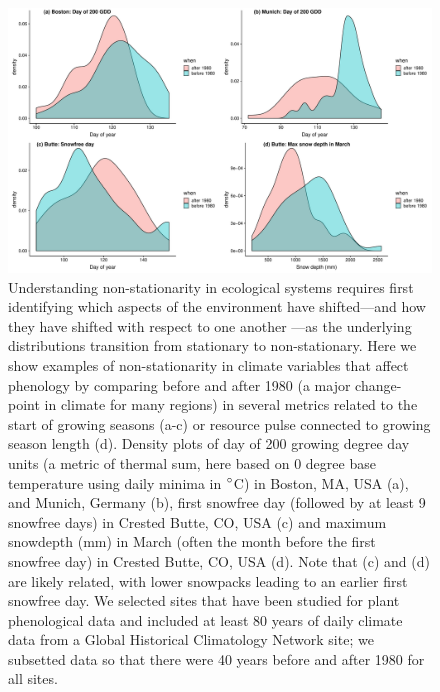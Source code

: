 \documentclass[11pt,letterpaper]{article}
\begin{document}
\begin{figure}[h!]
\centering
\includegraphics[width=1\textwidth]{..//..//..//R/graphs/otherdat/climdata.pdf}
\caption{Understanding non-stationarity in ecological systems requires first identifying which aspects of the environment have shifted---and how they have shifted with respect to one another \citep[e.g.,][]{cookwine2016,wadgymar2018}---as the underlying  distributions transition from stationary to non-stationary. Here we show examples of non-stationarity in climate variables that affect phenology by comparing before and after 1980 (a major change-point in climate for many regions) in several metrics related to the start of growing seasons (a-c) or resource pulse connected to growing season length (d). Density plots of day of 200 growing degree day units (a metric of thermal sum, here based on 0 degree base temperature using daily minima in $\degree$C) in Boston, MA, USA (a), and Munich, Germany (b), first snowfree day (followed by at least 9 snowfree days) in Crested Butte, CO, USA (c) and maximum snowdepth (mm) in March (often the month before the first snowfree day) in Crested Butte, CO, USA (d). Note that (c) and (d) are likely related, with lower snowpacks leading to an earlier first snowfree day. We selected sites that have been studied for plant phenological data and included at least 80 years of daily climate data from a Global Historical Climatology Network site; we subsetted data so that there were 40 years before and after 1980 for all sites.} %
 \label{fig:climdat}
\end{figure}
\end{document}
